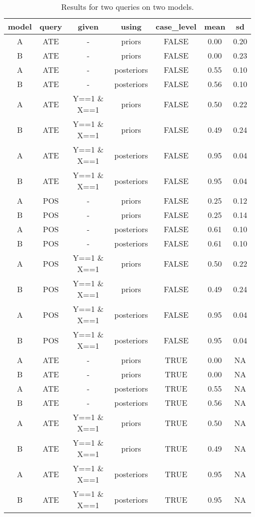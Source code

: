 \documentclass[
  11pt,
  article]{jss}
\begin{document}
\begin{longtable}[t]{ccccccc}

\caption{\label{tbl-batch-query}Results for two queries on two models.}

\tabularnewline

\toprule
model & query & given & using & case\_level & mean & sd\\
\midrule
A & ATE & - & priors & FALSE & 0.00 & 0.20\\
B & ATE & - & priors & FALSE & 0.00 & 0.23\\
A & ATE & - & posteriors & FALSE & 0.55 & 0.10\\
B & ATE & - & posteriors & FALSE & 0.56 & 0.10\\
A & ATE & Y==1 \& X==1 & priors & FALSE & 0.50 & 0.22\\
\addlinespace
B & ATE & Y==1 \& X==1 & priors & FALSE & 0.49 & 0.24\\
A & ATE & Y==1 \& X==1 & posteriors & FALSE & 0.95 & 0.04\\
B & ATE & Y==1 \& X==1 & posteriors & FALSE & 0.95 & 0.04\\
A & POS & - & priors & FALSE & 0.25 & 0.12\\
B & POS & - & priors & FALSE & 0.25 & 0.14\\
\addlinespace
A & POS & - & posteriors & FALSE & 0.61 & 0.10\\
B & POS & - & posteriors & FALSE & 0.61 & 0.10\\
A & POS & Y==1 \& X==1 & priors & FALSE & 0.50 & 0.22\\
B & POS & Y==1 \& X==1 & priors & FALSE & 0.49 & 0.24\\
A & POS & Y==1 \& X==1 & posteriors & FALSE & 0.95 & 0.04\\
\addlinespace
B & POS & Y==1 \& X==1 & posteriors & FALSE & 0.95 & 0.04\\
A & ATE & - & priors & TRUE & 0.00 & NA\\
B & ATE & - & priors & TRUE & 0.00 & NA\\
A & ATE & - & posteriors & TRUE & 0.55 & NA\\
B & ATE & - & posteriors & TRUE & 0.56 & NA\\
\addlinespace
A & ATE & Y==1 \& X==1 & priors & TRUE & 0.50 & NA\\
B & ATE & Y==1 \& X==1 & priors & TRUE & 0.49 & NA\\
A & ATE & Y==1 \& X==1 & posteriors & TRUE & 0.95 & NA\\
B & ATE & Y==1 \& X==1 & posteriors & TRUE & 0.95 & NA\\

\end{longtable}
\end{document}
